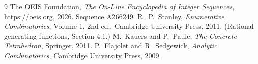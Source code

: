 \documentclass[11pt,a4paper]{article}
\theoremstyle{plain}
\theoremstyle{definition}
\begin{document}
\begin{thebibliography}{9}
 The OEIS Foundation, \emph{The On-Line Encyclopedia of Integer
Sequences}, \url{https://oeis.org}, 2026. Sequence A266249.
 R.~P.~Stanley, \emph{Enumerative Combinatorics}, Volume 1, 2nd ed.,
Cambridge University Press, 2011. (Rational generating functions, Section 4.1.)
 M.~Kauers and P.~Paule, \emph{The Concrete Tetrahedron}, Springer, 2011.
 P.~Flajolet and R.~Sedgewick, \emph{Analytic Combinatorics}, Cambridge
University Press, 2009.
\end{thebibliography}
\end{document}

